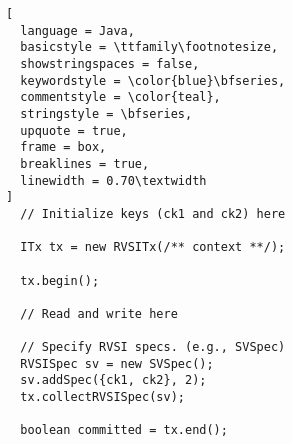 \begin{lstlisting}[
  language = Java,
  basicstyle = \ttfamily\footnotesize,
  showstringspaces = false,
  keywordstyle = \color{blue}\bfseries,
  commentstyle = \color{teal},
  stringstyle = \bfseries,
  upquote = true,
  frame = box,
  breaklines = true,
  linewidth = 0.70\textwidth
]
  // Initialize keys (ck1 and ck2) here

  ITx tx = new RVSITx(/** context **/);

  tx.begin();

  // Read and write here

  // Specify RVSI specs. (e.g., SVSpec)
  RVSISpec sv = new SVSpec();
  sv.addSpec({ck1, ck2}, 2);
  tx.collectRVSISpec(sv);

  boolean committed = tx.end();
\end{lstlisting}
